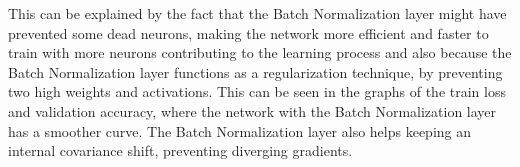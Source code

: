 \documentclass{article}
\begin{document}
This can be explained by the fact that the Batch Normalization layer
might have prevented some dead neurons, making the network more efficient and faster to train with more neurons
contributing to the learning process and also because the Batch Normalization layer functions
as a regularization technique, by preventing two high weights and activations. This can be seen in the graphs
of the train loss and validation accuracy, where the network with the Batch Normalization layer has a smoother
curve. 
The Batch Normalization layer also helps keeping an internal covariance shift, preventing diverging gradients.






 
\end{document}
